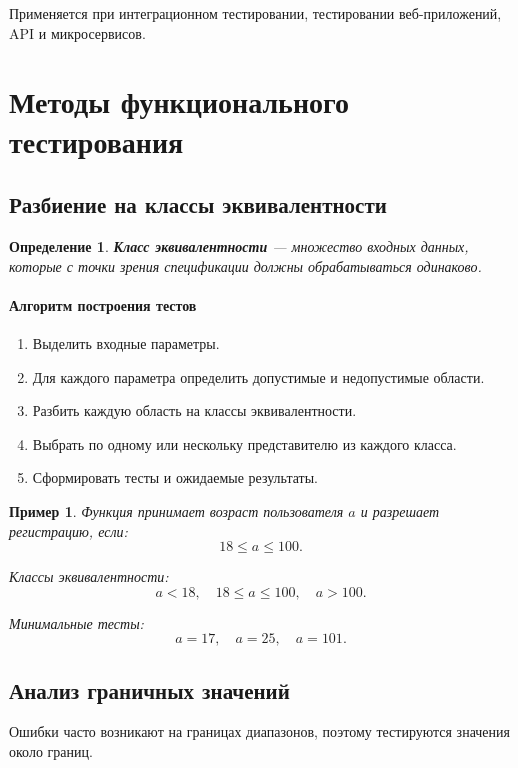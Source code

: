 \documentclass[12pt,a4paper]{article}
\newtheorem{definition}{Определение}
\newtheorem{example}{Пример}
\begin{document}
Применяется при интеграционном тестировании, тестировании веб-приложений, API и микросервисов.

\section{Методы функционального тестирования}

\subsection{Разбиение на классы эквивалентности}

\begin{definition}
\textbf{Класс эквивалентности} --- множество входных данных, которые с точки зрения спецификации должны обрабатываться одинаково.
\end{definition}

\paragraph{Алгоритм построения тестов}

\begin{enumerate}
    \item Выделить входные параметры.
    \item Для каждого параметра определить допустимые и недопустимые области.
    \item Разбить каждую область на классы эквивалентности.
    \item Выбрать по одному или нескольку представителю из каждого класса.
    \item Сформировать тесты и ожидаемые результаты.
\end{enumerate}

\begin{example}
Функция принимает возраст пользователя $a$ и разрешает регистрацию, если:
\[
18 \leq a \leq 100.
\]

Классы эквивалентности:
\[
a < 18,\quad 18 \leq a \leq 100,\quad a > 100.
\]

Минимальные тесты:
\[
a = 17,\quad a = 25,\quad a = 101.
\]
\end{example}

\subsection{Анализ граничных значений}

Ошибки часто возникают на границах диапазонов, поэтому тестируются значения около границ.
\end{document}
